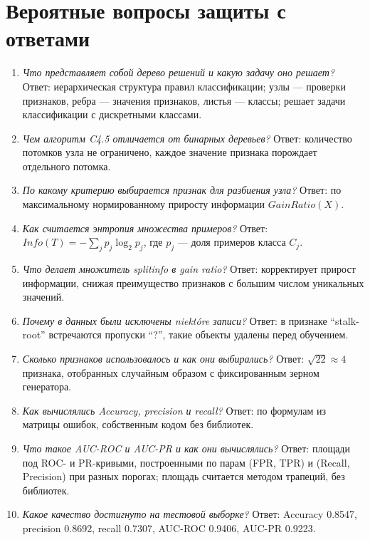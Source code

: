 \documentclass[12pt,a4paper]{article}
\begin{document}
\section{Вероятные вопросы защиты с ответами}
\begin{enumerate}
\item \emph{Что представляет собой дерево решений и какую задачу оно решает?}
Ответ: иерархическая структура правил классификации; узлы --- проверки признаков, ребра --- значения признаков, листья --- классы; решает задачи классификации с дискретными классами.

\item \emph{Чем алгоритм C4.5 отличается от бинарных деревьев?}
Ответ: количество потомков узла не ограничено, каждое значение признака порождает отдельного потомка.

\item \emph{По какому критерию выбирается признак для разбиения узла?}
Ответ: по максимальному нормированному приросту информации $GainRatio(X)$.

\item \emph{Как считается энтропия множества примеров?}
Ответ: $Info(T) = -\sum_j p_j \log_2 p_j$, где $p_j$ --- доля примеров класса $C_j$.

\item \emph{Что делает множитель splitinfo в gain ratio?}
Ответ: корректирует прирост информации, снижая преимущество признаков с большим числом уникальных значений.

\item \emph{Почему в данных были исключены niektóre записи?}
Ответ: в признаке ``stalk-root'' встречаются пропуски ``?'', такие объекты удалены перед обучением.

\item \emph{Сколько признаков использовалось и как они выбирались?}
Ответ: $\sqrt{22} \approx 4$ признака, отобранных случайным образом с фиксированным зерном генератора.

\item \emph{Как вычислялись Accuracy, precision и recall?}
Ответ: по формулам из матрицы ошибок, собственным кодом без библиотек.

\item \emph{Что такое AUC-ROC и AUC-PR и как они вычислялись?}
Ответ: площади под ROC- и PR-кривыми, построенными по парам (FPR, TPR) и (Recall, Precision) при разных порогах; площадь считается методом трапеций, без библиотек.

\item \emph{Какое качество достигнуто на тестовой выборке?}
Ответ: Accuracy 0.8547, precision 0.8692, recall 0.7307, AUC-ROC 0.9406, AUC-PR 0.9223.
\end{enumerate}
\end{document}
